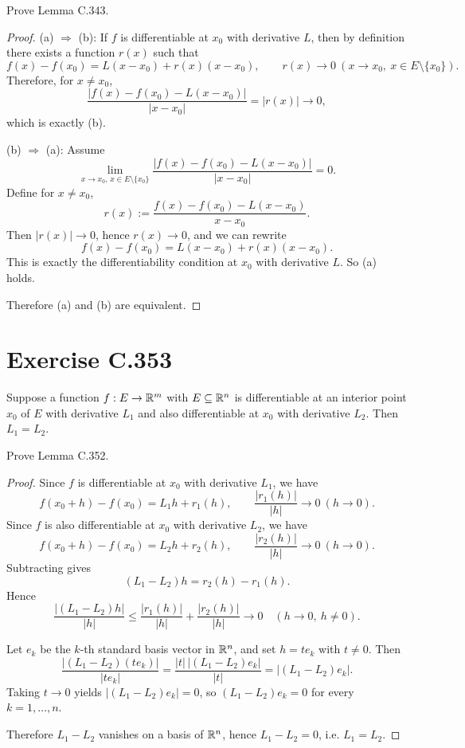 \documentclass{article}
\begin{document}
Prove Lemma C.343.

\begin{proof}
  (a) $\Rightarrow$ (b): If $f$ is differentiable at $x_0$ with derivative
  $L$, then by definition there exists a function $r(x)$ such that
  \[
    f(x)-f(x_0)=L(x-x_0)+r(x)(x-x_0),
    \qquad r(x)\to 0 \ (x\to x_0,\ x\in E\setminus\{x_0\}).
  \]
  Therefore, for $x\neq x_0$,
  \[
    \frac{|f(x)-f(x_0)-L(x-x_0)|}{|x-x_0|}=|r(x)|\to 0,
  \]
  which is exactly (b).

  (b) $\Rightarrow$ (a): Assume
  \[
    \lim_{x\to x_0,\,x\in E\setminus\{x_0\}}
    \frac{|f(x)-f(x_0)-L(x-x_0)|}{|x-x_0|}=0.
  \]
  Define for $x\neq x_0$,
  \[
    r(x):=\frac{f(x)-f(x_0)-L(x-x_0)}{x-x_0}.
  \]
  Then $|r(x)|\to 0$, hence $r(x)\to 0$, and we can rewrite
  \[
    f(x)-f(x_0)=L(x-x_0)+r(x)(x-x_0).
  \]
  This is exactly the differentiability condition at $x_0$ with
  derivative $L$. So (a) holds.

  Therefore (a) and (b) are equivalent.
\end{proof}

\section{Exercise C.353}

\begin{lemma}[Lemma C.352]
  Suppose a function $f : E \to \mathbb{R}^m$ with $E \subseteq \mathbb{R}^n$
  is differentiable at an interior point $x_0$ of $E$ with derivative
  $L_1$ and also differentiable at $x_0$ with derivative $L_2$.
  Then $L_1=L_2$.
\end{lemma}

Prove Lemma C.352.

\begin{proof}
  Since $f$ is differentiable at $x_0$ with derivative $L_1$, we have
  \[
    f(x_0+h)-f(x_0)=L_1h+r_1(h),
    \qquad \frac{|r_1(h)|}{|h|}\to 0 \ (h\to 0).
  \]
  Since $f$ is also differentiable at $x_0$ with derivative $L_2$, we have
  \[
    f(x_0+h)-f(x_0)=L_2h+r_2(h),
    \qquad \frac{|r_2(h)|}{|h|}\to 0 \ (h\to 0).
  \]
  Subtracting gives
  \[
    (L_1-L_2)h=r_2(h)-r_1(h).
  \]
  Hence
  \[
    \frac{|(L_1-L_2)h|}{|h|}
    \le
    \frac{|r_1(h)|}{|h|}+\frac{|r_2(h)|}{|h|}
    \to 0
    \quad (h\to 0,\ h\neq 0).
  \]

  Let $e_k$ be the $k$-th standard basis vector in $\mathbb{R}^n$, and set
  $h=t e_k$ with $t\neq 0$. Then
  \[
    \frac{|(L_1-L_2)(t e_k)|}{|t e_k|}
    = \frac{|t|\,|(L_1-L_2)e_k|}{|t|}
    = |(L_1-L_2)e_k|.
  \]
  Taking $t\to 0$ yields $|(L_1-L_2)e_k|=0$, so
  $(L_1-L_2)e_k=0$ for every $k=1,\dots,n$.

  Therefore $L_1-L_2$ vanishes on a basis of $\mathbb{R}^n$, hence
  $L_1-L_2=0$, i.e. $L_1=L_2$.
\end{proof}
\end{document}
